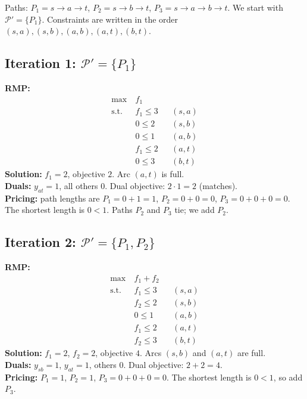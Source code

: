 \documentclass[11pt]{article}
\begin{document}
\begin{center}
\end{center}

Paths: $P_1=s\to a\to t$, $P_2=s\to b\to t$, $P_3=s\to a\to b\to t$. We start with $\mathcal{P}'=\{P_1\}$. Constraints are written in the order $(s,a),(s,b),(a,b),(a,t),(b,t)$.

\subsection*{Iteration 1: $\mathcal{P}'=\{P_1\}$}
\textbf{RMP:}
\begin{align*}
\max\ & f_1\\
\text{s.t.}\ & f_1\le 3 && (s,a)\\
& 0\le 2 && (s,b)\\
& 0\le 1 && (a,b)\\
& f_1\le 2 && (a,t)\\
& 0\le 3 && (b,t)
\end{align*}
\textbf{Solution:} $f_1=2$, objective $2$. Arc $(a,t)$ is full.\\
\textbf{Duals:} $y_{at}=1$, all others $0$. Dual objective: $2\cdot 1=2$ (matches).\\
\textbf{Pricing:} path lengths are $P_1=0+1=1$, $P_2=0+0=0$, $P_3=0+0+0=0$. The shortest length is $0<1$. Paths $P_2$ and $P_3$ tie; we add $P_2$.

\subsection*{Iteration 2: $\mathcal{P}'=\{P_1,P_2\}$}
\textbf{RMP:}
\begin{align*}
\max\ & f_1+f_2\\
\text{s.t.}\ & f_1\le 3 && (s,a)\\
& f_2\le 2 && (s,b)\\
& 0\le 1 && (a,b)\\
& f_1\le 2 && (a,t)\\
& f_2\le 3 && (b,t)
\end{align*}
\textbf{Solution:} $f_1=2$, $f_2=2$, objective $4$. Arcs $(s,b)$ and $(a,t)$ are full.\\
\textbf{Duals:} $y_{sb}=1$, $y_{at}=1$, others $0$. Dual objective: $2+2=4$.\\
\textbf{Pricing:} $P_1=1$, $P_2=1$, $P_3=0+0+0=0$. The shortest length is $0<1$, so add $P_3$.
\end{document}
